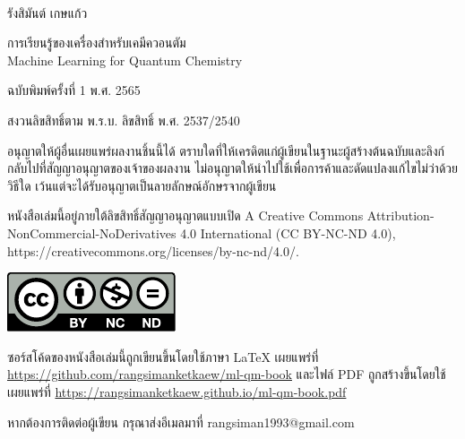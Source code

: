

{
~\vfill
\thispagestyle{empty}
\setlength{\parindent}{0em}

รังสิมันต์ เกษแก้ว

การเรียนรู้ของเครื่องสำหรับเคมีควอนตัม\\
Machine Learning for Quantum Chemistry

\bigskip

\par{ฉบับพิมพ์ครั้งที่ 1 พ.ศ. 2565}

สงวนลิขสิทธิ์ตาม พ.ร.บ. ลิขสิทธิ์ พ.ศ. 2537/2540

อนุญาตให้ผู้อื่นเผยแพร่ผลงานชิ้นนี้ได้ ตราบใดที่ให้เครดิตแก่ผู้เขียนในฐานะผู้สร้างต้นฉบับและลิงก์กลับไปที่สัญญาอนุญาตของเจ้าของผลงาน 
ไม่อนุญาตให้นำไปใช้เพื่อการค้าและดัดแปลงแก้ไขไม่ว่าด้วยวิธีใด เว้นแต่จะได้รับอนุญาตเป็นลายลักษณ์อักษรจากผู้เขียน

หนังสือเล่มนี้อยู่ภายใต้ลิขสิทธิ์สัญญาอนุญาตแบบเปิด A Creative Commons Attribution-NonCommercial-NoDerivatives 4.0 
International (CC BY-NC-ND 4.0), https://creativecommons.org/licenses/by-nc-nd/4.0/.

\includegraphics[scale=1.2]{by-nc-nd.pdf}

\bigskip

ซอร์สโค้ดของหนังสือเล่มนี้ถูกเขียนขึ้นโดยใช้ภาษา {\selectfont \LaTeX} เผยแพร่ที่ 
\url{https://github.com/rangsimanketkaew/ml-qm-book} และไฟล์ PDF ถูกสร้างขึ้นโดยใช้ {\selectfont 
\XeLaTeX} เผยแพร่ที่ \url{https://rangsimanketkaew.github.io/ml-qm-book.pdf}

หากต้องการติดต่อผู้เขียน กรุณาส่งอีเมลมาที่ rangsiman1993@gmail.com
}
